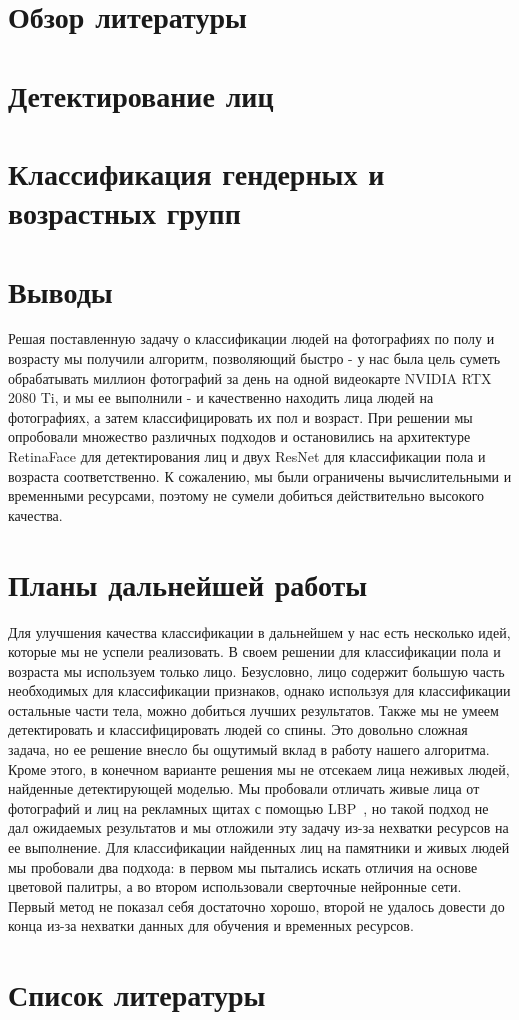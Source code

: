 \documentclass[a4paper,14pt]{extarticle}
\begin{document}
    \section{Обзор литературы}\label{sec:обзор-литературы}
    


    \section{Детектирование лиц}\label{sec:детектирование-лиц}
    
    \newpage


    \section{Классификация гендерных и возрастных групп}\label{sec:классификация-гендерных-и-возрастных-групп}
    
    \newpage


    \section{Выводы}\label{sec:выводы}
    Решая поставленную задачу о классификации людей на фотографиях по полу и возрасту мы получили алгоритм,
    позволяющий быстро - у нас была цель суметь обрабатывать миллион фотографий за день на одной видеокарте NVIDIA RTX 2080 Ti,
    и мы ее выполнили - и качественно находить лица людей на фотографиях, а затем классифицировать их пол и возраст.
    При решении мы опробовали множество различных подходов и остановились на архитектуре RetinaFace для детектирования лиц и двух ResNet для классификации пола и возраста соответственно.
    К сожалению, мы были ограничены вычислительными и временными ресурсами, поэтому не сумели добиться действительно высокого качества.
    \newpage


    \section{Планы дальнейшей работы}\label{sec:планы-дальнейшей-работы}
    Для улучшения качества классификации в дальнейшем у нас есть несколько идей, которые мы не успели реализовать.
    В своем решении для классификации пола и возраста мы используем только лицо.
    Безусловно, лицо содержит большую часть необходимых для классификации признаков, однако используя для классификации остальные части тела, можно добиться лучших результатов.
    Также мы не умеем детектировать и классифицировать людей со спины.
    Это довольно сложная задача, но ее решение внесло бы ощутимый вклад в работу нашего алгоритма.
    Кроме этого, в конечном варианте решения мы не отсекаем лица неживых людей, найденные детектирующей моделью.
    Мы пробовали отличать живые лица от фотографий и лиц на рекламных щитах с помощью LBP~\cite{lbp},
    но такой подход не дал ожидаемых результатов и мы отложили эту задачу из-за нехватки ресурсов на ее выполнение.
    Для классификации найденных лиц на памятники и живых людей мы пробовали два подхода:
    в первом мы пытались искать отличия на основе цветовой палитры, а во втором использовали сверточные нейронные сети.
    Первый метод не показал себя достаточно хорошо, второй не удалось довести до конца из-за нехватки данных для обучения и временных ресурсов.
    \newpage


    \section{Список литературы}\label{sec:список-литературы}
    
\end{document}
